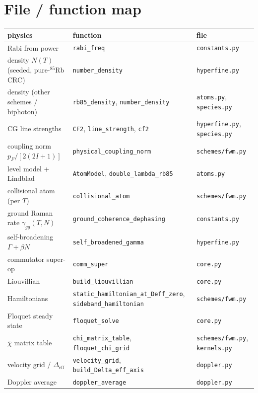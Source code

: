 \documentclass[11pt]{article}
\newcommand{\eff}{\mathrm{eff}}
\newcommand{\code}[1]{\texttt{#1}}
\newcommand{\rhobar}{\bar{\chi}}
\begin{document}
\section{File / function map}

\begin{center}\footnotesize
\setlength{\tabcolsep}{5pt}
\begin{tabular}{lll}
\toprule
physics & function & file \\
\midrule
Rabi from power & \code{rabi\_freq} & \code{constants.py} \\
density $N(T)$ (seeded, pure-$^{85}$Rb CRC) & \code{number\_density} & \code{hyperfine.py} \\
density (other schemes / biphoton) & \code{rb85\_density}, \code{number\_density} & \code{atoms.py}, \code{species.py} \\
CG line strengths & \code{CF2}, \code{line\_strength}, \code{cf2} & \code{hyperfine.py}, \code{species.py} \\
coupling norm $p_F/[2(2I+1)]$ & \code{physical\_coupling\_norm} & \code{schemes/fwm.py} \\
level model + Lindblad & \code{AtomModel}, \code{double\_lambda\_rb85} & \code{atoms.py} \\
collisional atom (per $T$) & \code{collisional\_atom} & \code{schemes/fwm.py} \\
ground Raman rate $\gamma_{gg}(T,N)$ & \code{ground\_coherence\_dephasing} & \code{constants.py} \\
self-broadening $\Gamma+\beta N$ & \code{self\_broadened\_gamma} & \code{hyperfine.py} \\
commutator super-op & \code{comm\_super} & \code{core.py} \\
Liouvillian & \code{build\_liouvillian} & \code{core.py} \\
Hamiltonians & \code{static\_hamiltonian\_at\_Deff\_zero}, \code{sideband\_hamiltonian} & \code{schemes/fwm.py} \\
Floquet steady state & \code{floquet\_solve} & \code{core.py} \\
$\rhobar$ matrix table & \code{chi\_matrix\_table}, \code{floquet\_chi\_grid} & \code{schemes/fwm.py}, \code{kernels.py} \\
velocity grid / $\Delta_\eff$ & \code{velocity\_grid}, \code{build\_Delta\_eff\_axis} & \code{doppler.py} \\
Doppler average & \code{doppler\_average} & \code{doppler.py} \\

\end{tabular}
\end{center}
\end{document}
